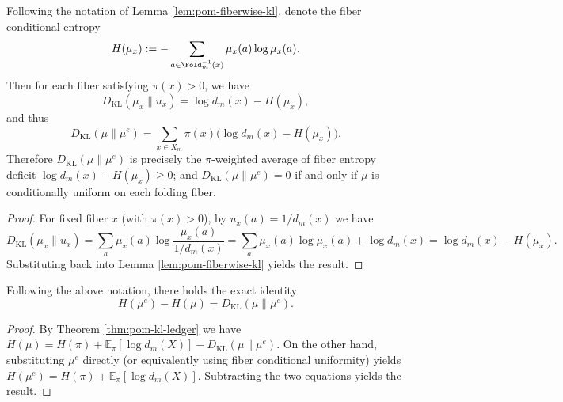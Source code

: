 \begin{corollary}\label{cor:pom-fiber-entropy-deficit}
Following the notation of Lemma \ref{lem:pom-fiberwise-kl}, denote the fiber conditional entropy
\[
H(\mu_x):=-\sum_{a\in\Fold_m^{-1}(x)}\mu_x(a)\log \mu_x(a).
\]
Then for each fiber satisfying $\pi(x)>0$, we have
\[
D_{\mathrm{KL}}(\mu_x\|u_x)=\log d_m(x)-H(\mu_x),
\]
and thus
\[
\boxed{\;
D_{\mathrm{KL}}(\mu\|\mu^e)
=\sum_{x\in X_m}\pi(x)\bigl(\log d_m(x)-H(\mu_x)\bigr).
\;}
\]
Therefore $D_{\mathrm{KL}}(\mu\|\mu^e)$ is precisely the $\pi$-weighted average of fiber entropy deficit \(\log d_m(x)-H(\mu_x)\ge 0\); and $D_{\mathrm{KL}}(\mu\|\mu^e)=0$ if and only if $\mu$ is conditionally uniform on each folding fiber.
\end{corollary}

\begin{proof}
For fixed fiber \(x\) (with \(\pi(x)>0\)), by \(u_x(a)=1/d_m(x)\) we have
\[
D_{\mathrm{KL}}(\mu_x\|u_x)
=\sum_{a}\mu_x(a)\log\frac{\mu_x(a)}{1/d_m(x)}
=\sum_a \mu_x(a)\log\mu_x(a)+\log d_m(x)
=\log d_m(x)-H(\mu_x).
\]
Substituting back into Lemma \ref{lem:pom-fiberwise-kl} yields the result.
\end{proof}

\begin{corollary}\label{cor:pom-ent-increase-equals-kl}
Following the above notation, there holds the exact identity
\[
\boxed{\;
H(\mu^e)-H(\mu)=D_{\mathrm{KL}}(\mu\|\mu^e).
\;}
\]
\end{corollary}
\begin{proof}
By Theorem \ref{thm:pom-kl-ledger} we have
\(
H(\mu)=H(\pi)+\mathbb{E}_{\pi}[\log d_m(X)]-D_{\mathrm{KL}}(\mu\|\mu^e)
\).
On the other hand, substituting $\mu^e$ directly (or equivalently using fiber conditional uniformity) yields
\(
H(\mu^e)=H(\pi)+\mathbb{E}_{\pi}[\log d_m(X)]
\).
Subtracting the two equations yields the result.
\end{proof}

